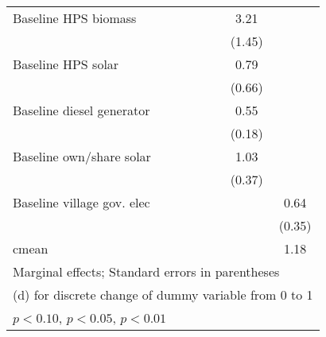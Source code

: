 \begin{table}[htbp]
\begin{tabular*}{1\hsize}{@{\hskip\tabcolsep\extracolsep\fill}l*{6}{c}}
Baseline HPS biomass&                  &                  &                  &                  &     3.21\sym{**} &                  \\
                &                  &                  &                  &                  &   (1.45)         &                  \\
Baseline HPS solar&                  &                  &                  &                  &     0.79         &                  \\
                &                  &                  &                  &                  &   (0.66)         &                  \\
Baseline diesel generator&                  &                  &                  &                  &     0.55\sym{***}&                  \\
                &                  &                  &                  &                  &   (0.18)         &                  \\
Baseline own/share solar&                  &                  &                  &                  &     1.03\sym{***}&                  \\
                &                  &                  &                  &                  &   (0.37)         &                  \\
Baseline village gov. elec&                  &                  &                  &                  &                  &     0.64\sym{*}  \\
                &                  &                  &                  &                  &                  &   (0.35)         \\
\midrule
cmean           &                  &                  &                  &                  &                  &     1.18         \\
\bottomrule
\multicolumn{7}{l}{\footnotesize Marginal effects; Standard errors in parentheses}\\
\multicolumn{7}{l}{\footnotesize  (d) for discrete change of dummy variable from 0 to 1}\\
\multicolumn{7}{l}{\footnotesize \sym{*} \(p<0.10\), \sym{**} \(p<0.05\), \sym{***} \(p<0.01\)}\\
\end{tabular*}
\end{table}
